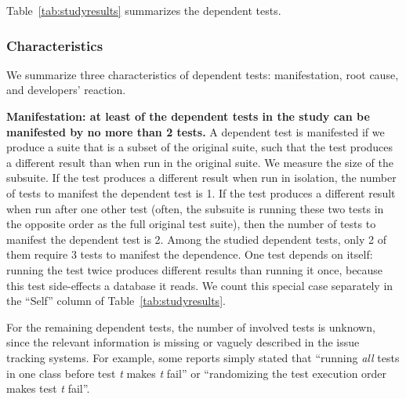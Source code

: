 

Table~\ref{tab:studyresults} summarizes the dependent tests.


\subsubsection{Characteristics}


We summarize three characteristics of dependent tests:
manifestation, root cause, and developers' reaction.

\vspace{1mm}
\noindent \textbf{{Manifestation: at least \pertange of the dependent
tests in the study can be manifested by no more than 2 tests.}}
A dependent test is manifested if we produce a suite that is a 
subset of the original suite, such that the test produces a different
result than when run in the original suite.
We measure the size of the subsuite.
If the test produces a different result when run
in isolation, the number of tests to manifest
the dependent test is 1.
If the test produces a different result
when run after one other test (often, the subsuite is
running these two tests in the opposite order as the full original test
suite), then the number of tests to manifest the dependent test is 2.
Among the \dtnum studied dependent tests, only 2 of them
require 3 tests to manifest the dependence.
One test depends on itself:
running the test twice produces different results than running it once,
because this test side-effects a database it reads.
We count this special case separately in the ``Self'' column
of Table~\ref{tab:studyresults}.

For the remaining \unum dependent tests, the number of involved tests
is unknown, since the relevant information is missing
or vaguely described in the issue tracking systems. For example,
some reports simply stated that ``running \textit{all} tests in one class before
test \emph{t} makes \emph{t} fail'' or ``randomizing the test execution order
makes test \emph{t} fail''.






